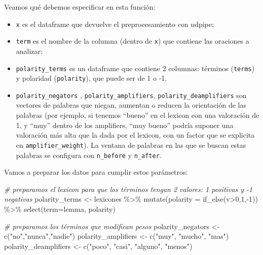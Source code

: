 \documentclass[
]{book}
\newenvironment{Shaded}{\begin{snugshade}}{\end{snugshade}}
\newcommand{\AttributeTok}[1]{\textcolor[rgb]{0.77,0.63,0.00}{#1}}
\newcommand{\CommentTok}[1]{\textcolor[rgb]{0.56,0.35,0.01}{\textit{#1}}}
\newcommand{\DecValTok}[1]{\textcolor[rgb]{0.00,0.00,0.81}{#1}}
\newcommand{\FunctionTok}[1]{\textcolor[rgb]{0.00,0.00,0.00}{#1}}
\newcommand{\NormalTok}[1]{#1}
\newcommand{\OtherTok}[1]{\textcolor[rgb]{0.56,0.35,0.01}{#1}}
\newcommand{\SpecialCharTok}[1]{\textcolor[rgb]{0.00,0.00,0.00}{#1}}
\newcommand{\StringTok}[1]{\textcolor[rgb]{0.31,0.60,0.02}{#1}}
\providecommand{\tightlist}{%
  \setlength{\itemsep}{0pt}\setlength{\parskip}{0pt}}
\begin{document}
Veamos qué debemos especificar en esta función:

\begin{itemize}
\tightlist
\item
  \texttt{x} es el dataframe que devuelve el preprocesamiento con udpipe;
\item
  \texttt{term} es el nombre de la columna (dentro de \texttt{x}) que contiene las oraciones a analizar;
\item
  \texttt{polarity\_terms} es un dataframe que contiene 2 columnas: términos (\texttt{terms}) y polaridad (\texttt{polarity}), que puede ser de 1 o -1.
\item
  \texttt{polarity\_negators} , \texttt{polarity\_amplifiers}, \texttt{polarity\_deamplifiers} son vectores de palabras que niegan, aumentan o reducen la orientación de las palabras (por ejemplo, si tenemos ``bueno'' en el lexicon con una valoración de 1, y ``muy'' dentro de los amplifiers, ``muy bueno'' podría suponer una valoración más alta que la dada por el lexicon, con un factor que se explicita en \texttt{amplifier\_weight}). La ventana de palabras en las que se buscan estas palabras se configura con \texttt{n\_before} y \texttt{n\_after}.
\end{itemize}

Vamos a preparar los datos para cumplir estos parámetros:

\begin{Shaded}
\begin{Highlighting}[]
\CommentTok{\# preparamos el lexicon para que los términos tengan 2 valores: 1 positivas y {-}1 negativas}
\NormalTok{polarity\_terms }\OtherTok{\textless{}{-}}\NormalTok{ lexicones }\SpecialCharTok{\%\textgreater{}\%}
  \FunctionTok{mutate}\NormalTok{(}\AttributeTok{polarity =} \FunctionTok{if\_else}\NormalTok{(v}\SpecialCharTok{\textgreater{}}\DecValTok{0}\NormalTok{,}\DecValTok{1}\NormalTok{,}\SpecialCharTok{{-}}\DecValTok{1}\NormalTok{)) }\SpecialCharTok{\%\textgreater{}\%}
  \FunctionTok{select}\NormalTok{(}\AttributeTok{term=}\NormalTok{lemma, polarity)}

\CommentTok{\# preparamos los términos que modifican pesos}
\NormalTok{polarity\_negators }\OtherTok{\textless{}{-}} \FunctionTok{c}\NormalTok{(}\StringTok{"no"}\NormalTok{,}\StringTok{"nunca"}\NormalTok{,}\StringTok{"nadie"}\NormalTok{)}
\NormalTok{polarity\_amplifiers }\OtherTok{\textless{}{-}} \FunctionTok{c}\NormalTok{(}\StringTok{"muy"}\NormalTok{, }\StringTok{"mucho"}\NormalTok{, }\StringTok{"mas"}\NormalTok{)}
\NormalTok{polarity\_deamplifiers }\OtherTok{\textless{}{-}} \FunctionTok{c}\NormalTok{(}\StringTok{"poco"}\NormalTok{, }\StringTok{"casi"}\NormalTok{, }\StringTok{"alguno"}\NormalTok{, }\StringTok{"menos"}\NormalTok{)}
\end{Highlighting}
\end{Shaded}
\end{document}
